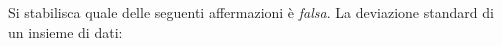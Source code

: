 Si stabilisca quale delle seguenti affermazioni è 
\emph{falsa}.
La deviazione standard di un insieme di dati: